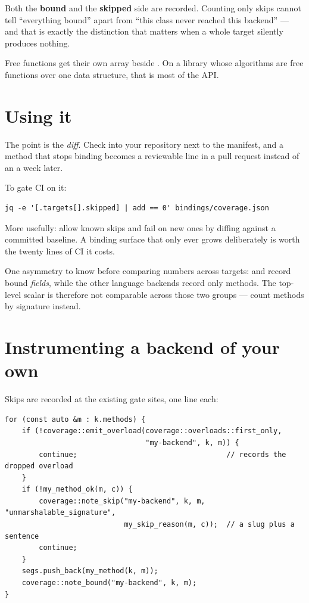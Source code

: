 Both the \textbf{bound} and the \textbf{skipped} side are recorded. Counting
only skips cannot tell ``everything bound'' apart from ``this class never
reached this backend'' --- and that is exactly the distinction that matters when
a whole target silently produces nothing.

Free functions get their own  array beside . On a library whose algorithms are
free functions over one data structure, that is most of the API.

\section{Using it}

The point is the \emph{diff}. Check  into your repository
next to the manifest, and a method that stops binding becomes a reviewable line
in a pull request instead of an  a week later.

To gate CI on it:

\begin{lstlisting}[style=sh]
jq -e '[.targets[].skipped] | add == 0' bindings/coverage.json
\end{lstlisting}

More usefully: allow known skips and fail on new ones by diffing against a
committed baseline. A binding surface that only ever grows deliberately is worth
the twenty lines of CI it costs.

\begin{warn}
One asymmetry to know before comparing numbers across targets:
 and  record bound \emph{fields}, while the other
language backends record only methods. The top-level  scalar is
therefore not comparable across those two groups --- count methods by signature
instead.
\end{warn}

\section{Instrumenting a backend of your own}

Skips are recorded at the existing gate sites, one line each:

\begin{lstlisting}[style=cpp]
for (const auto &m : k.methods) {
    if (!coverage::emit_overload(coverage::overloads::first_only,
                                 "my-backend", k, m)) {
        continue;                                   // records the dropped overload
    }
    if (!my_method_ok(m, c)) {
        coverage::note_skip("my-backend", k, m, "unmarshalable_signature",
                            my_skip_reason(m, c));  // a slug plus a sentence
        continue;
    }
    segs.push_back(my_method(k, m));
    coverage::note_bound("my-backend", k, m);
}
\end{lstlisting}

